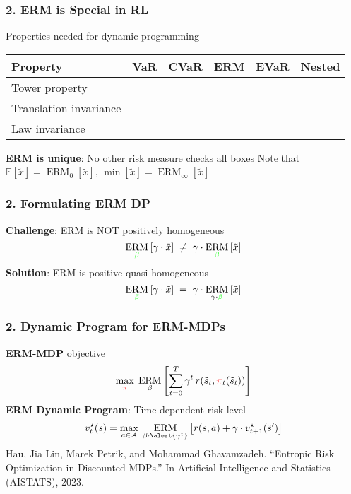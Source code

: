 \documentclass{beamer}
\newcommand{\opt}{^{\star}}
\newcommand{\tc}[2]{\textcolor{#1}{#2}}
\newcommand{\tcr}[1]{\tc{red}{#1}}
\newcommand{\tcg}[1]{\tc{green}{#1}}
\newcommand{\cmark}{\tcg{\ding{51}}}%
\newcommand{\xmark}{\tcr{\ding{55}}}%
\DeclareMathOperator{\ermo}{ERM}
\newcommand{\erm}[2]{\ermo_{#1}\left[#2\right]}
\begin{document}
\begin{frame} \frametitle{2. ERM is Special in RL}
  \begin{center}
    Properties needed for dynamic programming
        \begin{tabular}{|l|ccccc|}
        \toprule
        Property &  VaR & CVaR & \alert{ERM} & EVaR & Nested \\
        \midrule
        Tower property           & \xmark & \xmark & \cmark & \xmark & \cmark \\
        Translation invariance   & \cmark & \cmark & \cmark & \cmark & \cmark \\
        Law invariance           & \cmark & \cmark & \cmark & \cmark & \xmark \\
        \bottomrule
        \end{tabular}
      \end{center}
      \vfill 
      \textbf{ERM is unique}: No other risk measure checks all boxes
        \vfill
       Note that $\mathbb{E}[ \tilde{x} ] = \erm{0}{\tilde{x}}$, $\min [\tilde{x}] = \erm{\infty}{\tilde{x}}$
\end{frame}
  
\begin{frame} \frametitle{2. Formulating ERM DP}
  \textbf{Challenge}: ERM is NOT positively homogeneous
  \[
   \erm{\tcg\beta}{ \gamma \cdot  \tilde{x} } \;\neq\;  \gamma \cdot  \erm{\tcg\beta}{ \tilde{x} }
  \]
  \vfill 
  \textbf{Solution}: ERM is positive quasi-homogeneous
  \[
   \erm{\tcg\beta}{ \gamma \cdot  \tilde{x} } \;  =\;  \gamma \cdot  \erm{\gamma \cdot \tcg\beta}{ \tilde{x} }
 \]
\end{frame}
\begin{frame} \frametitle{2. Dynamic Program for ERM-MDPs}
   \textbf{ERM-MDP} objective
        \[
          \max_{\tcr{\pi}} \;
          \erm{\beta}{\sum_{t=0}^T \gamma^t \, r(\tilde{s}_t, \tcr{\pi}_t(\tilde{s}_t)) }
        \]
        \vfill 
    \textbf{ERM Dynamic Program}: \alert{Time-dependent} risk level 
    \[
    v\opt_t(s) = \max_{a\in \mathcal{A}} \; \erm{\beta \cdot \alert{ \gamma^t }} {r(s,a) + \gamma \cdot  v_{t+1}\opt(\tilde{s}') }
  \]
  \vfill
  {\tiny  Hau, Jia Lin, Marek Petrik, and Mohammad Ghavamzadeh. “Entropic Risk Optimization in Discounted MDPs.” In Artificial Intelligence and Statistics (AISTATS), 2023.}
\end{frame}
\end{document}
